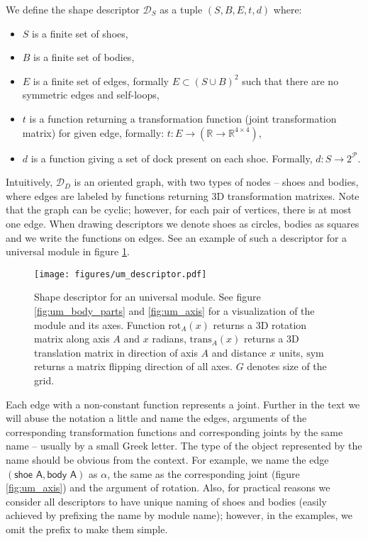 We define the shape descriptor $\mathcal{D}_S$ as a tuple $(S, B, E, t, d)$
where:
\begin{itemize}
    \item $S$ is a finite set of shoes,
    \item $B$ is a finite set of bodies,
    \item $E$ is a finite set of edges, formally $E \subset (S\cup B)^2$ such
    that there are no symmetric edges and self-loops,
    \item $t$ is a function returning a transformation function (joint
    transformation matrix) for given edge, formally: $t:
    E\rightarrow(\mathds{R}\rightarrow\mathds{R}^{4\times4})$,
    \item $d$ is a function giving a set of dock present on each shoe. Formally,
    $d: S\rightarrow 2^\mathcal{P}$.
\end{itemize}
Intuitively, $\mathcal{D}_D$ is an oriented graph, with two types of nodes --
shoes and bodies, where edges are labeled by functions returning 3D
transformation matrixes. Note that the graph can be cyclic; however, for each
pair of vertices, there is at most one edge. When drawing descriptors we denote
shoes as circles, bodies as squares and we write the functions on edges. See
an example of such a descriptor for a universal module in figure
\ref{fig:um_descriptor}.

\begin{figure}[t]
    \centering
    \texttt{[image: figures/um\_descriptor.pdf]}
    \caption{Shape descriptor for an universal module. See figure
    \ref{fig:um_body_parts} and \ref{fig:um_axis} for a visualization of the
    module and its axes. Function $\text{rot}_A(x)$ returns a 3D rotation matrix
    along axis $A$ and $x$ radians, $\text{trans}_A(x)$ returns a 3D translation
    matrix in direction of axis $A$ and distance $x$ units, $\text{sym}$ returns
    a matrix flipping direction of all axes. $G$ denotes size of the grid.}
    \label{fig:um_descriptor}
\end{figure}

Each edge with a non-constant function represents a joint. Further in the text
we will abuse the notation a little and name the edges, arguments of the
corresponding transformation functions and corresponding joints by the same name
-- usually by a small Greek letter. The type of the object represented by the
name should be obvious from the context. For example, we name the edge
$(\textsf{shoe A}, \textsf{body A})$ as $\alpha$, the same as the corresponding
joint (figure \ref{fig:um_axis}) and the argument of rotation. Also, for
practical reasons we consider all descriptors to have unique naming of shoes and
bodies (easily achieved by prefixing the name by module name); however, in the
examples, we omit the prefix to make them simple.

